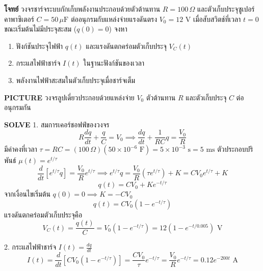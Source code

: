 \begin{mathexample}
\textbf{โจทย์} วงจรชาร์จระบบกักเก็บพลังงานประกอบด้วยตัวต้านทาน $R = 100\,\Omega$ และตัวเก็บประจุซูเปอร์คาพาซิเตอร์ $C = 50\,\mu\text{F}$ ต่ออนุกรมกับแหล่งจ่ายแรงดันตรง $V_0 = 12\text{ V}$ เมื่อสับสวิตช์ที่เวลา $t = 0$ ขณะเริ่มต้นไม่มีประจุสะสม ($q(0) = 0$) จงหา
\begin{enumerate}
    \item ฟังก์ชันประจุไฟฟ้า $q(t)$ และแรงดันตกคร่อมตัวเก็บประจุ $V_C(t)$
    \item กระแสไฟฟ้าชาร์จ $I(t)$ ในฐานะฟังก์ชันของเวลา
    \item พลังงานไฟฟ้าสะสมในตัวเก็บประจุเมื่อชาร์จเต็ม
\end{enumerate}

\vspace{0.2cm}
\textbf{PICTURE} วงจรลูปเดี่ยวประกอบด้วยแหล่งจ่าย $V_0$ ตัวต้านทาน $R$ และตัวเก็บประจุ $C$ ต่ออนุกรมกัน

\vspace{0.2cm}
\textbf{SOLVE}
1. สมการเคอร์ชอฟฟ์ของวงจร
\begin{equation}
R\frac{dq}{dt} + \frac{q}{C} = V_0 \implies \frac{dq}{dt} + \frac{1}{RC}q = \frac{V_0}{R}
\end{equation}
มีค่าคงที่เวลา $\tau = RC = (100\,\Omega)(50 \times 10^{-6}\text{ F}) = 5 \times 10^{-3}\text{ s} = 5\text{ ms}$
ตัวประกอบปริพันธ์ $\mu(t) = e^{t/\tau}$
\begin{equation}
\frac{d}{dt}\left[ e^{t/\tau} q \right] = \frac{V_0}{R} e^{t/\tau} \implies e^{t/\tau} q = \frac{V_0}{R}(\tau e^{t/\tau}) + K = C V_0 e^{t/\tau} + K
\end{equation}
\begin{equation}
q(t) = C V_0 + K e^{-t/\tau}
\end{equation}
จากเงื่อนไขเริ่มต้น $q(0) = 0 \implies K = -C V_0$
\begin{equation}
q(t) = C V_0 \left(1 - e^{-t/\tau}\right)
\end{equation}
แรงดันตกคร่อมตัวเก็บประจุคือ
\begin{equation}
V_C(t) = \frac{q(t)}{C} = V_0 \left(1 - e^{-t/\tau}\right) = 12\left(1 - e^{-t/0.005}\right)\text{ V}
\end{equation}

2. กระแสไฟฟ้าชาร์จ $I(t) = \frac{dq}{dt}$
\begin{equation}
I(t) = \frac{d}{dt}\left[ C V_0 (1 - e^{-t/\tau}) \right] = \frac{C V_0}{\tau} e^{-t/\tau} = \frac{V_0}{R} e^{-t/\tau} = 0.12 e^{-200t}\text{ A}
\end{equation}


\end{mathexample}
